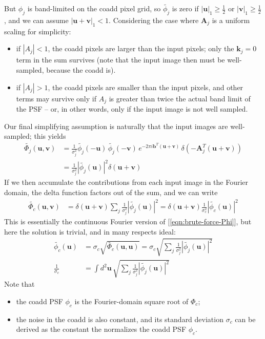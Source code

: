 \documentclass[DM,authoryear,toc]{lsstdoc}
\begin{document}
But $\phi_j$ is band-limited on the coadd pixel grid, so $\widetilde{\phi_j}$ is zero if $|\symbf{u}|_1 \ge \frac{1}{2}$ or $|\symbf{v}|_1 \ge \frac{1}{2}$, and we can assume $|\symbf{u} + \symbf{v}|_1 < 1$.
Considering the case where $\symbf{A}_j$ is a uniform scaling for simplicity:
\begin{itemize}
    \item if $|A_j| < 1$, the coadd pixels are larger than the input pixels; only the $\symbf{k}_j = 0$ term in the sum survives (note that the input image then must be well-sampled, because the coadd is).
    \item if $|A_j| > 1$, the coadd pixels are smaller than the input pixels, and other terms may survive only if $A_j$ is greater than twice the actual band limit of the PSF -- or, in other words, only if the input image is not well sampled.
\end{itemize}

Our final simplifying assumption is naturally that the input images are well-sampled; this yields
\begin{align}
    \widetilde{\Phi_j}(\symbf{u}, \symbf{v}) &= \frac{1}{\sigma_j^2}
        \widetilde{\phi_j}(-\symbf{u}) \, \widetilde{\phi_j}(-\symbf{v}) \,
        e^{-2\pi i \symbf{b}^T(\symbf{u}+\symbf{v})} \,
        \delta\left(-\symbf{A}_j^T (\symbf{u} + \symbf{v}) \right) \\
    &= \frac{1}{\sigma_j^2}
        \left|\widetilde{\phi_j}(\symbf{u})\right|^2
        \delta(\symbf{u} + \symbf{v})
    \label{eqn:phi-simplified}
\end{align}
If we then accumulate the contributions from each input image in the Fourier domain, the delta function factors out of the sum, and we can write
\begin{align}
    \widetilde{\Phi_c}(\symbf{u}, \symbf{v})
        &= \delta(\symbf{u} + \symbf{v})
            \sum_j \frac{1}{\sigma_j^2} \left|\widetilde{\phi_j}(\symbf{u})\right|^2
        = \delta(\symbf{u} + \symbf{v})
            \frac{1}{\sigma_c^2} \left|\widetilde{\phi_c}(\symbf{u})\right|^2
\end{align}
This is essentially the continuous Fourier version of [\ref{eqn:brute-force-Phi}], but here the solution is trivial, and in many respects ideal:
\begin{align}
    \widetilde{\phi_c}(\symbf{u}) &= \sigma_c \sqrt{\widetilde{\Phi_c}(\symbf{u}, \symbf{u})}
        = \sigma_c \sqrt{\sum_j \frac{1}{\sigma_j^2} \left|\widetilde{\phi_j}(\symbf{u})\right|^2} \\
    \frac{1}{\sigma_c} &= \int\!\!d^2\symbf{u} \, \sqrt{\sum_j \frac{1}{\sigma_j^2} \left|\widetilde{\phi_j}(\symbf{u})\right|^2}
\end{align}
Note that
\begin{itemize}
    \item the coadd PSF $\phi_c$ is the Fourier-domain square root of $\Phi_c$;
    \item the noise in the coadd is also constant, and its standard deviation $\sigma_c$ can be derived as the constant the normalizes the coadd PSF $\phi_c$.
\end{itemize}
\end{document}
